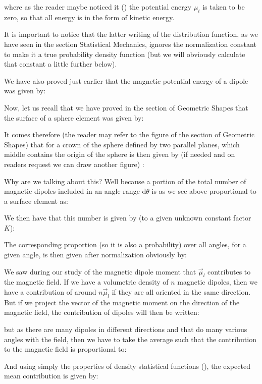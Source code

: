 	where as the reader maybe noticed it () the potential energy $\mu_i$ is taken to be zero, so that all energy is in the form of kinetic energy.
	
	It is important to notice that the latter writing  of the distribution function, as we have seen in the section Statistical Mechanics, ignores the normalization constant to make it a true probability density function (but we will obviously calculate that constant a little further below).

	We have also proved just earlier that the magnetic potential energy of a dipole was given by:
	
	Now, let us recall that we have proved in the section of Geometric Shapes that the surface of a sphere element was given by:
	
	It comes therefore (the reader may refer to the figure of the section of Geometric Shapes) that for a crown of the sphere defined by two parallel planes, which middle contains the origin of the sphere is then given by (if needed and on readers request we can draw another figure) :
	
	Why are we talking about this? Well because a portion of the total number of magnetic dipoles included in an angle range $\mathrm{d}\theta$ is as we see above proportional to a surface element as:
	
	We then have that this number is given by (to a given unknown constant factor $K$):
	
	The corresponding proportion (so it is also a probability) over all angles, for a given angle, is then given after normalization obviously by:
	
	We saw during our study of the magnetic dipole moment that $\vec{\mu}_l$ contributes to the magnetic field. If we have a volumetric density of $n$ magnetic dipoles, then we have a contribution of around $n\vec{\mu}_l$ if they are all oriented in the same direction. But if we project the vector of the magnetic moment on the direction of the magnetic field, the contribution of dipoles will then be written:
	
	but as there are many dipoles in different directions and that do many various angles with the field, then we have to take the average such that the contribution to the magnetic field is proportional to:
	
	And using simply the properties of density statistical functions (), the expected mean contribution is given by:
	
